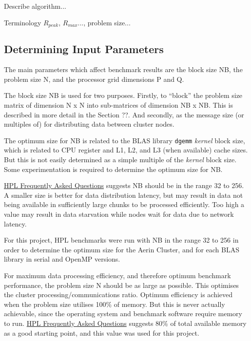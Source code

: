 \documentclass{report}
\begin{document}
Describe algorithm...

Terminology $R_{peak}$, $R_{max}$..., problem size...




%
%
\subsection{Determining Input Parameters}

The main parameters which affect benchmark results are the block size NB, the problem size N, and the processor grid dimensions P and Q.

The block size NB is used for two purposes. Firstly, to ``block'' the problem size matrix of dimension N x N into sub-matrices of dimension NB x NB. This is described in more detail in the Section ??. And secondly, as the message size (or multiples of) for distributing data between cluster nodes.

The optimum size for NB is related to the BLAS library \verb|dgemm| \emph{kernel} block size, which is related to CPU register and L1, L2, and L3 (when available) cache sizes. But this is not easily determined as a simple multiple of the \emph{kernel} block size. Some experimentation is required to determine the optimum size for NB.

\href{https://www.netlib.org/benchmark/hpl/faqs.html}{HPL Frequently Asked Questions} suggests NB should be in the range 32 to 256. A smaller size is better for data distribution latency, but may result in data not being available in sufficiently large chunks to be processed efficiently. Too high a value may result in data starvation while nodes wait for data due to network latency.

For this project, HPL benchmarks were run with NB in the range 32 to 256 in order to determine the optimum size for the Aerin Cluster, and for each BLAS library in serial and OpenMP versions. 

For maximum data processing efficiency, and therefore optimum benchmark performance, the problem size N should be as large as possible. This optimises the cluster processing/communications ratio. Optimum efficiency is achieved when the problem size utilises 100\% of memory. But this is never actually achievable, since the operating system and benchmark software require memory to run. \href{https://www.netlib.org/benchmark/hpl/faqs.html}{HPL Frequently Asked Questions} suggests 80\% of total available memory as a good starting point, and this value was used for this project.
\end{document}
